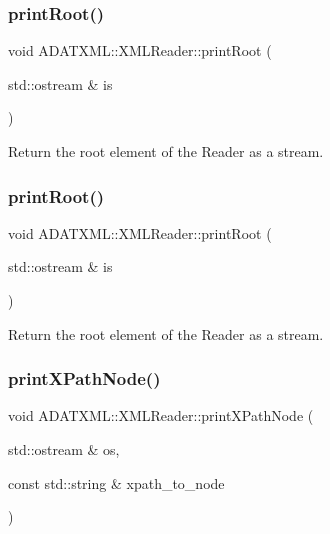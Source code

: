 \mbox{\label{classADATXML_1_1XMLReader_a732a08c1605f8c01663105bb3586b575}} 
\subsubsection{\texorpdfstring{printRoot()}{printRoot()}\hspace{0.1cm}{\footnotesize\ttfamily [2/3]}}
{\footnotesize\ttfamily void A\+D\+A\+T\+X\+M\+L\+::\+X\+M\+L\+Reader\+::print\+Root (\begin{DoxyParamCaption}\item[{std\+::ostream \&}]{is }\end{DoxyParamCaption})}



Return the root element of the Reader as a stream. 

\mbox{\label{classADATXML_1_1XMLReader_a732a08c1605f8c01663105bb3586b575}} 
\subsubsection{\texorpdfstring{printRoot()}{printRoot()}\hspace{0.1cm}{\footnotesize\ttfamily [3/3]}}
{\footnotesize\ttfamily void A\+D\+A\+T\+X\+M\+L\+::\+X\+M\+L\+Reader\+::print\+Root (\begin{DoxyParamCaption}\item[{std\+::ostream \&}]{is }\end{DoxyParamCaption})}



Return the root element of the Reader as a stream. 

\mbox{\label{classADATXML_1_1XMLReader_ae1bbeacb282c3e9b33750d36aea11d32}} 
\subsubsection{\texorpdfstring{printXPathNode()}{printXPathNode()}\hspace{0.1cm}{\footnotesize\ttfamily [1/3]}}
{\footnotesize\ttfamily void A\+D\+A\+T\+X\+M\+L\+::\+X\+M\+L\+Reader\+::print\+X\+Path\+Node (\begin{DoxyParamCaption}\item[{std\+::ostream \&}]{os,  }\item[{const std\+::string \&}]{xpath\+\_\+to\+\_\+node }\end{DoxyParamCaption})}



